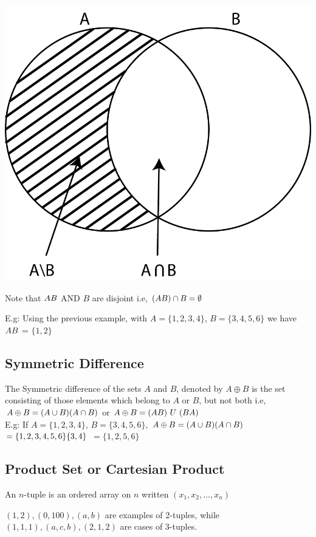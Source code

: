 \begin{center}
    \includegraphics[width=0.5\linewidth]{chapter/sets and elements/intersection.png}
\end{center}


\begin{para}
    Note that $A\text{\\}B$ AND $B$ are disjoint i.e, $(A\text{\\}B) \cap B = \emptyset$
\end{para}

\begin{para}
    E.g: Using the previous example, with $A = \{1,2,3,4\}$, $B = \{3,4,5,6\}$ we have $A\text{\\}B$ = $\{1,2\}$
\end{para}


\subsection{Symmetric Difference}

\begin{para}
    The Symmetric difference of the sets $A$ and $B$, denoted by $A \oplus B$ is the set consisting of those elements which belong to $A$ or $B$, but not both i.e, $A \oplus B = (A \cup B)\text{\\}(A \cap B)$ or $A \oplus B = (A \text{\\}B)\nobreakspace U \nobreakspace(B\text{\\}A)$\\
    E.g: If $A=\{1,2,3,4\}$, $B=\{3,4,5,6\}$, $A \oplus B = (A \cup B)\text{\\}(A \cap B)$ $=\{1,2,3,4,5,6\} \text{\\}\{3,4\}$ $= \{1,2,5,6\}$
\end{para}

\subsection{Product Set or Cartesian Product}
\begin{para}
    An $n$-tuple is an ordered array on $n$ written $(x_1,x_2,\ldots,x_n)$
\end{para}
\begin{para}
    $(1,2), (0, 100), (a, b)$ are examples of 2-tuples, while $(1,1,1), (a,c,b), (2,1,2)$ are cases of 3-tuples.
\end{para}

